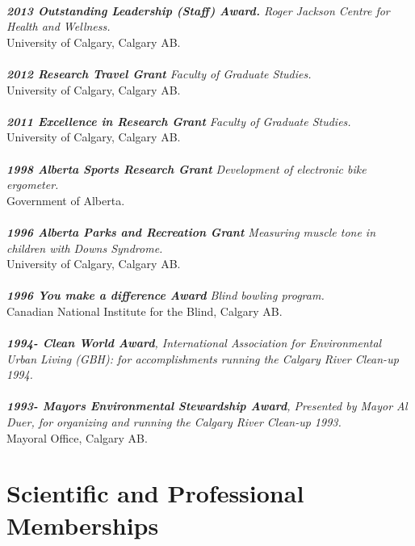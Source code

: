 \documentclass[]{friggeri-cv}
\begin{document}
\\
\emph{\textbf{2013 Outstanding Leadership (Staff) Award.} Roger Jackson Centre for Health and Wellness.\\}
{University of Calgary, Calgary AB.\\}
\\
\emph{\textbf{2012 Research Travel Grant} Faculty of Graduate Studies.\\} {University of Calgary, Calgary AB.\\}
\\
\emph{\textbf{2011 Excellence in Research Grant} Faculty of Graduate Studies.\\}
{University of Calgary, Calgary AB.\\}
\\
\emph{\textbf{1998 Alberta Sports Research Grant} Development of electronic bike ergometer.\\}
{Government of Alberta.\\}
\\
\emph{\textbf{1996 Alberta Parks and Recreation Grant} Measuring muscle tone in children with Downs Syndrome.\\}
{University of Calgary, Calgary AB.\\}
\\
\emph{\textbf{1996 You make a difference Award} Blind bowling program.\\}
{Canadian National Institute for the Blind, Calgary AB.\\}
\\
\emph{\textbf{1994- Clean World Award}, International Association for Environmental Urban Living (GBH): for accomplishments running the Calgary River Clean-up 1994.\\}
\\
\emph{\textbf{1993- Mayors Environmental Stewardship Award}, Presented by Mayor Al Duer, for organizing and running the Calgary River Clean-up 1993.\\}
{Mayoral Office, Calgary AB.\\}
\section{Scientific and Professional Memberships}
\end{document}
